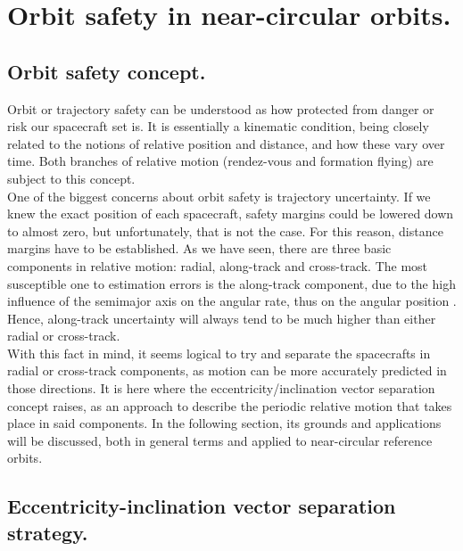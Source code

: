 \section{Orbit safety in near-circular orbits.}
%
%
	\subsection{Orbit safety concept.}
	\indent Orbit or trajectory safety can be understood as how protected from danger or risk our spacecraft set is. It is essentially a kinematic condition, being closely related to the notions of relative position and distance, and how these vary over time. Both branches of relative motion (\ie rendez-vous and formation flying) are subject to this concept. \\
	\indent One of the biggest concerns about orbit safety is trajectory uncertainty. If we knew the exact position of each spacecraft, safety margins could be lowered down to almost zero, but unfortunately, that is not the case. For this reason, distance margins have to be established. As we have seen, there are three basic components in relative motion: radial, along-track and cross-track. The most susceptible one to estimation errors is the along-track component, due to the high influence of the semimajor axis on the angular rate, thus on the angular position \cite{Eckstein}. Hence, along-track uncertainty will always tend to be much higher than either radial or cross-track.\\
	\indent With this fact in mind, it seems logical to try and separate the spacecrafts in radial or cross-track components, as motion can be more accurately predicted in those directions. It is here where the eccentricity/inclination vector separation concept raises, as an approach to describe the periodic relative motion that takes place in said components. In the following section, its grounds and applications will be discussed, both in general terms and applied to near-circular reference orbits.
	\subsection{Eccentricity-inclination vector separation strategy.}

